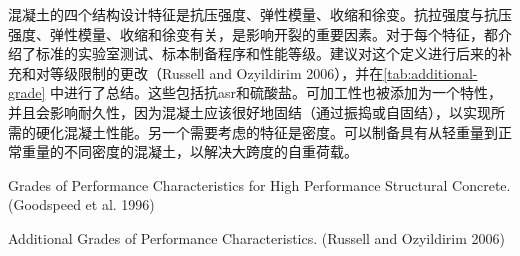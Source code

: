 混凝土的四个结构设计特征是抗压强度、弹性模量、收缩和徐变。抗拉强度与抗压强度、弹性模量、收缩和徐变有关，是影响开裂的重要因素。对于每个特征，都介绍了标准的实验室测试、标本制备程序和性能等级。建议对这个定义进行后来的补充和对等级限制的更改（Russell and Ozyildirim 2006），并在\cref{tab:additional-grade} 中进行了总结。这些包括抗\acrlong*{asr}和硫酸盐。可加工性也被添加为一个特性，并且会影响耐久性，因为混凝土应该很好地固结（通过振捣或自固结），以实现所需的硬化混凝土性能。另一个需要考虑的特征是密度。可以制备具有从轻重量到正常重量的不同密度的混凝土，以解决大跨度的自重荷载。

\begin{table}
  \caption{Grades of Performance Characteristics for High Performance Structural Concrete. (Goodspeed et al. 1996)}
  \label{tab:grade-hpc}
\end{table}

\begin{table}
  \caption{Additional Grades of Performance Characteristics. (Russell and Ozyildirim 2006)}\label{tab:additional-grade}
\end{table}

